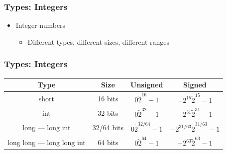 \documentclass{../c-lecture}
\begin{document}
\begin{frame}
  \frametitle{Types: Integers}
  \begin{itemize}
    \item Integer numbers
    \begin{itemize}
      \item Different types, different sizes, different ranges
    \end{itemize}
  \end{itemize}
\end{frame}

\begin{frame}
  \frametitle{Types: Integers}
  \begin{table}
  \begin{tabular}{cccc}
    \toprule

    Type &
    Size &
    Unsigned &
    Signed \\

    \midrule

    short &
    16 bits &
    $0 \tilde 2^{16} - 1$ &
    $-2^{15} \tilde 2^{15} - 1$ \\

    \midrule

    int &
    32 bits &
    $0 \tilde 2^{32} - 1$ &
    $-2^{31} \tilde 2^{31} - 1$ \\

    \midrule

    long --- long int &
    32/64 bits &
    $0 \tilde 2^{32/64} - 1$ &
    $-2^{31/63} \tilde 2^{31/63} - 1$ \\

    \midrule

    long long --- long long int &
    64 bits &
    $0 \tilde 2^{64} - 1$ &
    $-2^{63} \tilde 2^{63} - 1$ \\

    \bottomrule
  \end{tabular}
  \end{table}
\end{frame}
\end{document}
